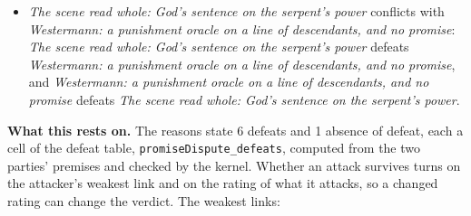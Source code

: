 \documentclass[11pt]{article}
\begin{document}
\begin{itemize}
\begin{itemize}
\item \emph{The scene read whole: God’s sentence on the serpent’s power} conflicts with \emph{Westermann: a punishment oracle on a line of descendants, and no promise}: \emph{The scene read whole: God’s sentence on the serpent’s power} defeats \emph{Westermann: a punishment oracle on a line of descendants, and no promise}, and \emph{Westermann: a punishment oracle on a line of descendants, and no promise} defeats \emph{The scene read whole: God’s sentence on the serpent’s power}.
\end{itemize}
\end{itemize}
\par\noindent\textbf{What this rests on.} The reasons state 6 defeats and 1 absence of defeat, each a cell of the defeat table, \texttt{promise\allowbreak{}Dispute\_\allowbreak{}defeats}, computed from the two parties' premises and checked by the kernel. Whether an attack survives turns on the attacker's weakest link and on the rating of what it attacks, so a changed rating can change the verdict. The weakest links:
\end{document}

